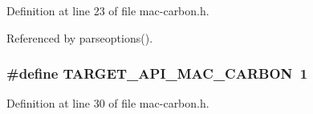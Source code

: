 Definition at line 23 of file mac-\/carbon.\+h.



Referenced by parseoptions().

\hypertarget{mac-carbon_8h_a8601b9b36b5d7d40e6d42c0e04dd936c}{
\subsubsection[{T\+A\+R\+G\+E\+T\+\_\+\+A\+P\+I\+\_\+\+M\+A\+C\+\_\+\+C\+A\+R\+B\+O\+N}]{\setlength{\rightskip}{0pt plus 5cm}\#define T\+A\+R\+G\+E\+T\+\_\+\+A\+P\+I\+\_\+\+M\+A\+C\+\_\+\+C\+A\+R\+B\+O\+N~1}}\label{mac-carbon_8h_a8601b9b36b5d7d40e6d42c0e04dd936c}


Definition at line 30 of file mac-\/carbon.\+h.

